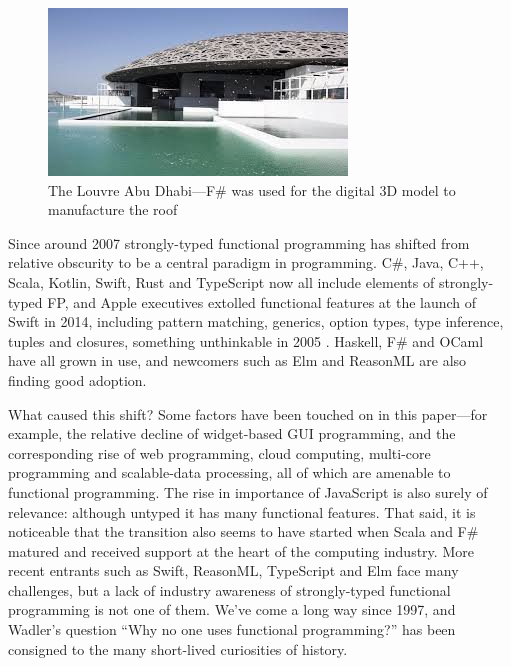 \documentclass[acmsmall,screen]{acmart}
\begin{document}
\begin{figure}

  \includegraphics[width=0.8\linewidth]{fig4.jpg}
  \caption{The Louvre Abu Dhabi---F\# was used for the digital 3D model to manufacture the roof}
  \label{fig:fig4}

\end{figure}

Since around 2007 strongly-typed functional programming has shifted from relative obscurity to be a central paradigm
in programming. C\#, Java, C++, Scala, Kotlin, Swift, Rust and TypeScript now all include elements of
strongly-typed FP, and Apple executives extolled functional features at the launch of Swift in 2014, including
pattern matching, generics, option types, type inference, tuples and closures,
something unthinkable in 2005 \citep{RefSwift}. 
Haskell, F\# and OCaml have all grown in use, and newcomers such as Elm and ReasonML are also finding good adoption.

What caused this shift? Some factors have been touched on in this paper---for example, the relative decline of
widget-based GUI programming, and the corresponding rise of web programming, cloud computing, multi-core
programming and scalable-data processing, all of which are amenable to functional programming. The rise in importance
of JavaScript is also surely of relevance: although untyped it has many functional features. That said, it is noticeable
that the transition also seems to have started when Scala and F\# matured and received support at the heart of the
computing industry. More recent entrants such as Swift, ReasonML, TypeScript and Elm face many challenges,
but a lack of industry awareness of strongly-typed functional programming is not one of them. We’ve come a long
way since 1997, and Wadler’s question “Why no one uses functional programming?” has been consigned to the many short-lived curiosities of history.
\end{document}
